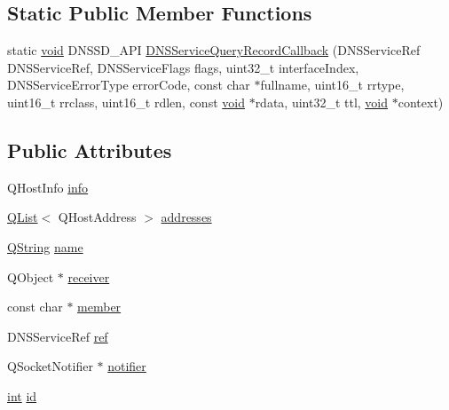 \subsection*{Static Public Member Functions}
\begin{DoxyCompactItemize}
\item 
static \hyperlink{group___u_a_v_objects_plugin_ga444cf2ff3f0ecbe028adce838d373f5c}{void} D\-N\-S\-S\-D\-\_\-\-A\-P\-I \hyperlink{class_qxt_m_d_n_s_a668dc438997af7775fafc197bc134de9}{D\-N\-S\-Service\-Query\-Record\-Callback} (D\-N\-S\-Service\-Ref D\-N\-S\-Service\-Ref, D\-N\-S\-Service\-Flags flags, uint32\-\_\-t interface\-Index, D\-N\-S\-Service\-Error\-Type error\-Code, const char $\ast$fullname, uint16\-\_\-t rrtype, uint16\-\_\-t rrclass, uint16\-\_\-t rdlen, const \hyperlink{group___u_a_v_objects_plugin_ga444cf2ff3f0ecbe028adce838d373f5c}{void} $\ast$rdata, uint32\-\_\-t ttl, \hyperlink{group___u_a_v_objects_plugin_ga444cf2ff3f0ecbe028adce838d373f5c}{void} $\ast$context)
\end{DoxyCompactItemize}
\subsection*{Public Attributes}
\begin{DoxyCompactItemize}
\item 
Q\-Host\-Info \hyperlink{class_qxt_m_d_n_s_aa59fedd01d3a81b4e9e4ab23efe02805}{info}
\item 
\hyperlink{class_q_list}{Q\-List}$<$ Q\-Host\-Address $>$ \hyperlink{class_qxt_m_d_n_s_a56517d9b9e3d792781581ae1378f8c5f}{addresses}
\item 
\hyperlink{group___u_a_v_objects_plugin_gab9d252f49c333c94a72f97ce3105a32d}{Q\-String} \hyperlink{class_qxt_m_d_n_s_a33c67c48dc301a8706919e0af75b9729}{name}
\item 
Q\-Object $\ast$ \hyperlink{class_qxt_m_d_n_s_adabe8b750f25f9dfa3d9e052a62df927}{receiver}
\item 
const char $\ast$ \hyperlink{class_qxt_m_d_n_s_a1f0da55979f7015f74686e51c8759a71}{member}
\item 
D\-N\-S\-Service\-Ref \hyperlink{class_qxt_m_d_n_s_a34e3ccaa5633fd035d66a16c1f1395fa}{ref}
\item 
Q\-Socket\-Notifier $\ast$ \hyperlink{class_qxt_m_d_n_s_a29ea9468b9e88400955341ffb1846245}{notifier}
\item 
\hyperlink{ioapi_8h_a787fa3cf048117ba7123753c1e74fcd6}{int} \hyperlink{class_qxt_m_d_n_s_a3dd3743f39cee3cdb18253f1b34cd448}{id}
\end{DoxyCompactItemize}



